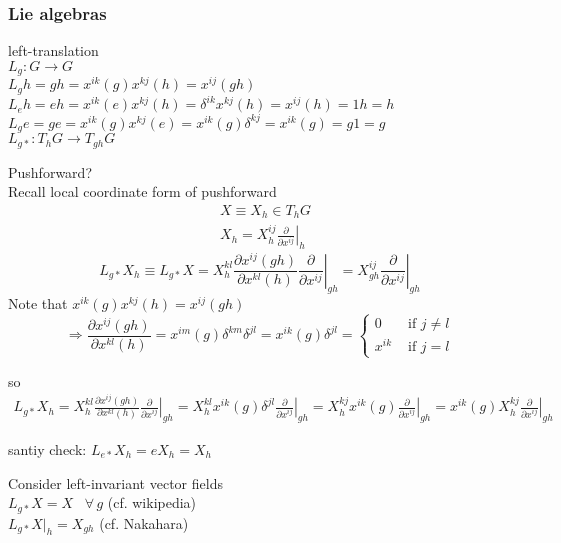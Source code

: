 \documentclass[twoside]{amsart}
\begin{document}
\subsubsection{ Lie algebras }

left-translation  \\
$L_g:G \to G$ \\
$L_gh = gh = x^{ik}{(g)} x^{kj}{(h)} = x^{ij}{(gh)}$ \\
$L_eh = eh = x^{ik}{ (e)} x^{kj}{ (h)} = \delta^{ik} x^{kj}{(h)} = x^{ij}{(h)} = 1h = h$ \\
$L_ge = ge = x^{ik}{(g)}x^{kj}{(e)} = x^{ik}{(g)}  \delta^{kj} = x^{ik}{(g)} = g1 = g $ \\
$L_{g*} : T_hG \to T_{gh}G$

Pushforward?  \\
Recall local coordinate form of pushforward 
\[
\begin{aligned}
  & X \equiv X_h \in T_h G \\ 
  & X_h = X_h^{ij} \left. \frac{ \partial }{ \partial x^{ij} } \right|_h 
\end{aligned}
\]
\[
L_{g*}X_h \equiv L_{g*} X = X_h^{kl} \frac{ \partial x^{ij}{ (gh) } }{ \partial x^{kl}{(h)} } \left. \frac{ \partial }{ \partial x^{ij} } \right|_{gh} = X^{ij}_{gh} \left. \frac{ \partial }{ \partial x^{ij} } \right|_{gh}
\]
Note that $x^{ik}{ (g)} x^{kj}{ (h)} = x^{ij}{ (gh)}$
\[
\Longrightarrow \frac{ \partial x^{ij}{(gh)} }{ \partial x^{kl}{ (h)} } = x^{im}{(g)} \delta^{km} \delta^{jl} = x^{ik}{ (g)} \delta^{jl} = \begin{cases} 0 & \text{ if } j\neq l \\ x^{ik} & \text{ if } j =l \end{cases}
\]

so
\[
\begin{gathered}
  L_{g*} X_h = X_h^{kl} \frac{ \partial x^{ij}{(gh)} }{ \partial x^{kl}{(h)} } \left. \frac{ \partial }{ \partial x^{ij} } \right|_{gh} = X^{kl}_h x^{ik}{(g)} \delta^{jl} \left. \frac{ \partial }{ \partial x^{ij} } \right|_{gh} = X^{kj}_h x^{ik}{(g)} \left. \frac{ \partial }{ \partial x^{ij}} \right|_{gh} = x^{ik}{(g)} X^{kj}_h \left. \frac{ \partial }{ \partial x^{ij}} \right|_{gh}
\end{gathered}
\]

santiy check: $L_{e*}X_h = eX_h = X_h$

Consider left-invariant vector fields  \\
\quad $L_{g*} X = X$ \, $\forall \, g$ (cf. wikipedia) \\
\quad $L_{g*} \left. X \right|_h = X_{gh}$ (cf. Nakahara) \\
\end{document}
